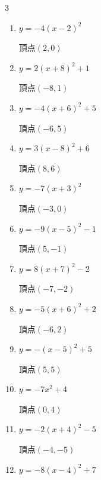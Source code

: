 \begin{multicols}{3}
\begin{enumerate}
  \item $\displaystyle y=-4\left( x-2\right)^{2}$

        $\displaystyle 頂点\left( 2 , 0 \right)$

  \item $\displaystyle y=2\left( x+8\right)^{2}+1$

        $\displaystyle 頂点\left( -8 , 1 \right)$

  \item $\displaystyle y=-4\left( x+6\right)^{2}+5$

        $\displaystyle 頂点\left( -6 , 5 \right)$

  \item $\displaystyle y=3\left( x-8\right)^{2}+6$

        $\displaystyle 頂点\left( 8 , 6 \right)$

  \item $\displaystyle y=-7\left( x+3\right)^{2}$

        $\displaystyle 頂点\left( -3 , 0 \right)$

  \item $\displaystyle y=-9\left( x-5\right)^{2}-1$

        $\displaystyle 頂点\left( 5 , -1 \right)$

  \item $\displaystyle y=8\left( x+7\right)^{2}-2$

        $\displaystyle 頂点\left( -7 , -2 \right)$

  \item $\displaystyle y=-5\left( x+6\right)^{2}+2$

        $\displaystyle 頂点\left( -6 , 2 \right)$

  \item $\displaystyle y=-\left( x-5\right)^{2}+5$

        $\displaystyle 頂点\left( 5 , 5 \right)$

\columnbreak %

  \item $\displaystyle y=-7x^{2}+4$

        $\displaystyle 頂点\left( 0 , 4 \right)$

  \item $\displaystyle y=-2\left( x+4\right)^{2}-5$

        $\displaystyle 頂点\left( -4 , -5 \right)$

  \item $\displaystyle y=-8\left( x-4\right)^{2}+7$


\end{enumerate}
\end{multicols}
